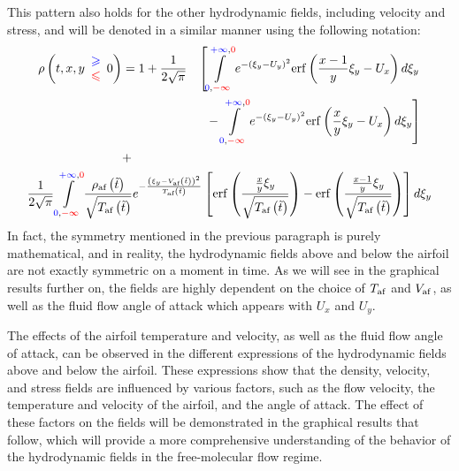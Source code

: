 This pattern also holds for the other hydrodynamic fields, including velocity and stress, and will be denoted in a similar manner using the following notation:
\begin{gather}\label{eq:density_free}
\begin{aligned}
\rho \left( t,x,y\begin{array}{ c }
\textcolor[rgb]{0,0,1}{\geqslant }\\
\textcolor[rgb]{1,0,0}{\leqslant }
\end{array} 0\right) & =1+\frac{1}{2\sqrt{\pi }} & \left[\int\limits _{\textcolor[rgb]{0,0,1}{0} ,\textcolor[rgb]{1,0,0}{-\infty }}^{\textcolor[rgb]{0,0,1}{+\infty } ,\textcolor[rgb]{1,0,0}{0}} e^{-( \xi _{y} -U_{y})^{2}}\mathrm{erf}\left(\frac{x-1}{y} \xi _{y} -U_{x}\right) d\xi _{y}\right. \\
 &  & -\left. \int\limits _{\textcolor[rgb]{0,0,1}{0} ,\textcolor[rgb]{1,0,0}{-\infty }}^{\textcolor[rgb]{0,0,1}{+\infty } ,\textcolor[rgb]{1,0,0}{0}} e^{-( \xi _{y} -U_{y})^{2}}\mathrm{erf}\left(\frac{x}{y} \xi _{y} -U_{x}\right) d\xi _{y}\right]\\
 & + & 
\end{aligned}\\
\frac{1}{2\sqrt{\pi }}\int\limits _{\textcolor[rgb]{0,0,1}{0} ,\textcolor[rgb]{1,0,0}{-\infty }}^{\textcolor[rgb]{0,0,1}{+\infty } ,\textcolor[rgb]{1,0,0}{0}}\frac{\rho _{\text{af}}\left(\tilde{t}\right)}{\sqrt{T_{\text{af}}\left(\tilde{t}\right)}} e^{-\frac{\left( \xi _{y} -V_{\text{af}}\left(\tilde{t}\right)\right)^{2}}{T_{\text{af}}\left(\tilde{t}\right)}}\left[\mathrm{erf}\left(\frac{\frac{x}{y} \xi _{y}}{\sqrt{T_{\text{af}}\left(\tilde{t}\right)}}\right) -\mathrm{erf}\left(\frac{\frac{x-1}{y} \xi _{y}}{\sqrt{T_{\text{af}}\left(\tilde{t}\right)}}\right)\right] d\xi _{y}
\label{eq:density_hitted}
\end{gather}
In fact, the symmetry mentioned in the previous paragraph is purely mathematical, and in reality, the hydrodynamic fields above and below the airfoil are not exactly symmetric on a moment in time. As we will see in the graphical results further on, the fields are highly dependent on the choice of $T_{\mathrm{af}}$ and $V_{\mathrm{af}}$, as well as the fluid flow angle of attack which appears with $U_x$ and $U_y$.

The effects of the airfoil temperature and velocity, as well as the fluid flow angle of attack, can be observed in the different expressions of the hydrodynamic fields above and below the airfoil. These expressions show that the density, velocity, and stress fields are influenced by various factors, such as the flow velocity, the temperature and velocity of the airfoil, and the angle of attack. The effect of these factors on the fields will be demonstrated in the graphical results that follow, which will provide a more comprehensive understanding of the behavior of the hydrodynamic fields in the free-molecular flow regime.

